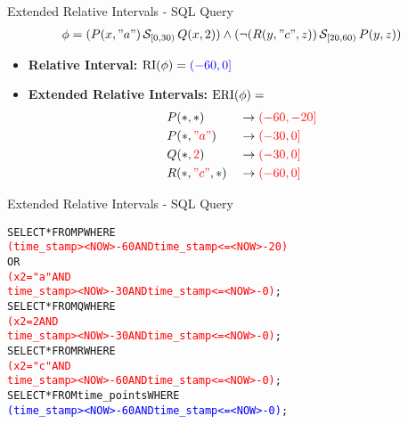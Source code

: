 \begin{frame}{Extended Relative Intervals - SQL Query}
    \begin{align*}
        \phi = 
        (P(x, "a") \,\mathcal{S}_{[0,30)}\, Q(x, 2))
        \land 
        (\neg (R(y, "c", z)) \,\mathcal{S}_{[20,60)}\, P(y, z))
    \end{align*}
    \begin{itemize}
        \item \textbf{Relative Interval:} $\operatorname{RI}(\phi) = \textcolor{blue}{(-60,0]}$
        \item \textbf{Extended Relative Intervals:} $\operatorname{ERI}(\phi) =$
        \begin{alignat*}{3}
            &P(*,*)                       &&\to \textcolor{red}{(-60,-20]}\\
            &P(*,\textcolor{red}{"a"})    &&\to \textcolor{red}{(-30,0]}\\
            &Q(*,\textcolor{red}{2})      &&\to \textcolor{red}{(-30,0]}\\
            &R(*,\textcolor{red}{"c"},*)  &&\to \textcolor{red}{(-60,0]}
        \end{alignat*}
    \end{itemize}
\end{frame}

\begin{frame}[fragile]{Extended Relative Intervals - SQL Query}
\begin{alltt}
SELECT * FROM P WHERE
    \textcolor{red}{(time_stamp > <NOW>-60 AND time_stamp <= <NOW>-20)}
    OR
    \textcolor{red}{(x2 = "a" AND
    time_stamp > <NOW> -30 AND time_stamp <= <NOW>-0)};
SELECT * FROM Q WHERE
    \textcolor{red}{ (x2 = 2 AND
    time_stamp > <NOW>-30 AND time_stamp <= <NOW>-0)};
SELECT * FROM R WHERE
    \textcolor{red}{ (x2 = "c" AND
    time_stamp > <NOW>-60 AND time_stamp <= <NOW>-0)};
SELECT * FROM time_points WHERE
    \textcolor{blue}{(time_stamp > <NOW>-60 AND time_stamp <= <NOW>-0)};
\end{alltt}
\end{frame}


